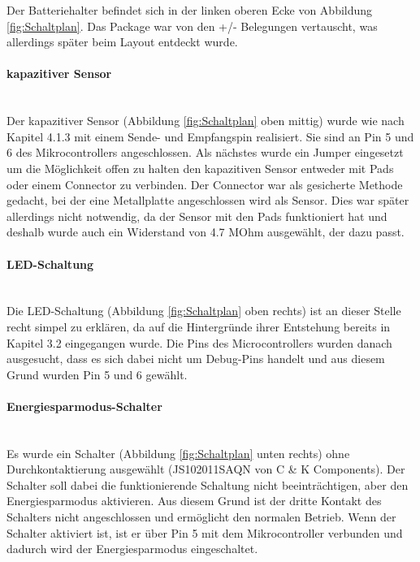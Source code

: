 \documentclass[a4paper,
DIV=13,
12pt,
BCOR=10mm,
department=FakEI,
parskip=half,
automark,
]{article}
\begin{document}
Der Batteriehalter befindet sich in der linken oberen Ecke von Abbildung \ref{fig:Schaltplan}. Das Package war von den +/- Belegungen vertauscht, was allerdings später beim Layout entdeckt wurde.

\paragraph{kapazitiver Sensor} $~$ \\

Der kapazitiver Sensor (Abbildung \ref{fig:Schaltplan} oben mittig) wurde wie nach Kapitel 4.1.3 mit einem Sende- und Empfangspin realisiert. Sie sind an Pin 5 und 6 des Mikrocontrollers angeschlossen. Als nächstes wurde ein Jumper eingesetzt um die Möglichkeit offen zu halten den kapazitiven Sensor entweder mit Pads oder einem Connector zu verbinden. Der Connector war als gesicherte Methode gedacht, bei der eine Metallplatte angeschlossen wird als Sensor. Dies war später allerdings nicht notwendig, da der Sensor mit den Pads funktioniert hat und deshalb wurde auch ein Widerstand von 4.7 MOhm ausgewählt, der dazu passt.

\newpage

\paragraph{LED-Schaltung} $~$ \\

Die LED-Schaltung (Abbildung \ref{fig:Schaltplan} oben rechts) ist an dieser Stelle recht simpel zu erklären, da auf die Hintergründe ihrer Entstehung bereits in Kapitel 3.2 eingegangen wurde. 
Die Pins des Microcontrollers wurden danach ausgesucht, dass es sich dabei nicht um Debug-Pins handelt und aus diesem Grund wurden Pin 5 und 6 gewählt.

\paragraph{Energiesparmodus-Schalter} $~$ \\

Es wurde ein Schalter (Abbildung \ref{fig:Schaltplan} unten rechts) ohne Durchkontaktierung ausgewählt (JS102011SAQN von C \& K Components). Der Schalter soll dabei die funktionierende Schaltung nicht beeinträchtigen, aber den Energiesparmodus aktivieren. Aus diesem Grund ist der dritte Kontakt des Schalters nicht angeschlossen und ermöglicht den normalen Betrieb. Wenn der Schalter \glqq aktiviert\grqq{} ist, ist er über Pin 5 mit dem Mikrocontroller verbunden und dadurch wird der Energiesparmodus eingeschaltet. 
\end{document}
